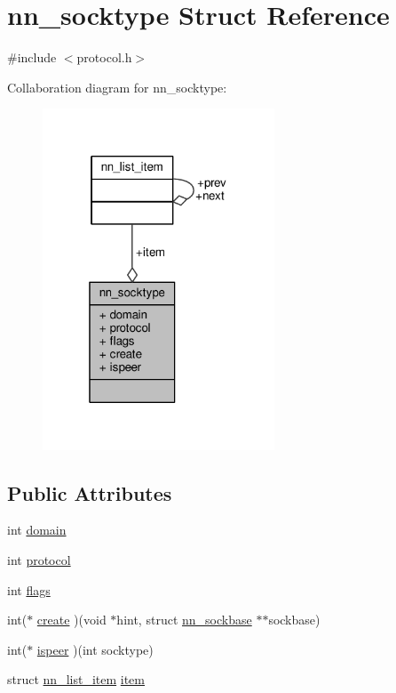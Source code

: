 \hypertarget{structnn__socktype}{}\section{nn\+\_\+socktype Struct Reference}
\label{structnn__socktype}


{\ttfamily \#include $<$protocol.\+h$>$}



Collaboration diagram for nn\+\_\+socktype\+:\nopagebreak
\begin{figure}[H]
\begin{center}
\leavevmode
\includegraphics[width=196pt]{structnn__socktype__coll__graph}
\end{center}
\end{figure}
\subsection*{Public Attributes}
\begin{DoxyCompactItemize}
\item 
int \hyperlink{structnn__socktype_a865681151fabc6cc207dfe6e173f129f}{domain}
\item 
int \hyperlink{structnn__socktype_a480a3fa2959895e5b761bc32f6be0a68}{protocol}
\item 
int \hyperlink{structnn__socktype_a2722660fbb0bd61add3cfdb00dcb48c4}{flags}
\item 
int($\ast$ \hyperlink{structnn__socktype_aaef1ec4f466bb440cb46ba97cf1b95fc}{create} )(void $\ast$hint, struct \hyperlink{structnn__sockbase}{nn\+\_\+sockbase} $\ast$$\ast$sockbase)
\item 
int($\ast$ \hyperlink{structnn__socktype_a07114a5bbc9ff799c734750e310cbf2d}{ispeer} )(int socktype)
\item 
struct \hyperlink{structnn__list__item}{nn\+\_\+list\+\_\+item} \hyperlink{structnn__socktype_a1c55011f6c127014a0d10503b1c228a5}{item}
\end{DoxyCompactItemize}


